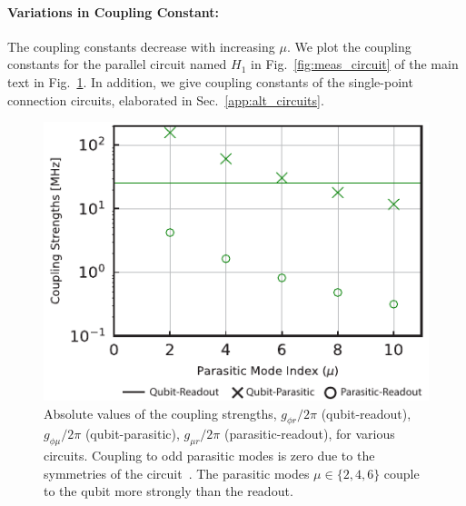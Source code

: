 \documentclass[%
reprint,
superscriptaddress,
 amsmath,amssymb,
 aps,
 prx,
longbibliography,
floatfix,
]{revtex4-2}
\begin{document}
\paragraph{Variations in Coupling Constant:}
The coupling constants decrease with increasing $\mu$. We plot the coupling constants for the parallel circuit named $H_1$ in Fig.~\ref{fig:meas_circuit} of the main text in Fig.~\ref{fig:coupling-strength}. In addition, we give coupling constants of the single-point connection circuits, elaborated in Sec.~\ref{app:alt_circuits}.
\begin{figure}[htb]
    \centering
    \includegraphics[width=\linewidth]{Supp_Fig/Coupling-strength.pdf}
    \caption{Absolute values of the coupling strengths, $g_{\phi r}/2\pi$ (qubit-readout), $g_{\phi\mu}/2\pi$ (qubit-parasitic), $g_{\mu r}/2\pi$ (parasitic-readout), for various circuits. Coupling to odd parasitic modes is zero due to the symmetries of the circuit~\cite{viola2015collective}. The parasitic modes $\mu\in\{2,4,6\}$ couple to the qubit more strongly than the readout.}
    \label{fig:coupling-strength}
\end{figure}
\end{document}
